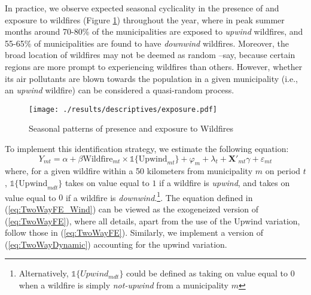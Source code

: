\documentclass[11pt]{article}
\begin{document}
\begin{spacing}{1.3}
In practice, we observe expected seasonal cyclicality in the presence of and exposure to wildfires (Figure \ref{fig:time}) throughout the year, where in peak summer months around 70-80\% of the municipalities are exposed to \textit{upwind} wildfires, and 55-65\% of municipalities are found to have \textit{downwind} wildfires. Moreover, the broad location of wildfires may not be deemed as random --say, because certain regions are more prompt to experiencing wildfires than others. However, whether its air pollutants are blown towards the population in a given municipality (i.e., an \textit{upwind} wildfire) can be considered a quasi-random process. 


\begin{figure}
    \centering
    \texttt{[image: ./results/descriptives/exposure.pdf]}
    \caption{Seasonal patterns of presence and exposure to Wildfires}
    \label{fig:time}
\end{figure}    


To implement this identification strategy, we estimate the following equation:
\begin{equation}
\label{eq:TwoWayFE_Wind}
Y_{mt}=\alpha + \beta\text{Wildfire}_{mt}\times\mathds{1}\{\text{Upwind}_{mt}\} + \varphi_{m} + \lambda_t + \bm{X}'_{mt}\gamma + \varepsilon_{mt}
\end{equation}
where, for a given wildfire within a 50 kilometers from municipality $m$ on period $t$, $\mathds{1}\{\text{Upwind}_{mdt}\}$ takes on value equal to $1$ if a wildfire is \textit{upwind}, and takes on value equal to $0$ if a wildfire is \textit{downwind}.\footnote{Alternatively,  $\mathds{1}\{Upwind_{mdt}\}$ could be defined as taking on value equal to $0$ when a wildfire is simply \textit{not-upwind} from a municipality $m$}.  The equation defined in (\ref{eq:TwoWayFE_Wind}) can be viewed as the exogeneized version of (\ref{eq:TwoWayFE}), where all details, apart from the use of the Upwind variation, follow those in (\ref{eq:TwoWayFE}). Similarly, we implement a version of (\ref{eq:TwoWayDynamic}) accounting for the upwind variation.


\end{spacing}
\end{document}
